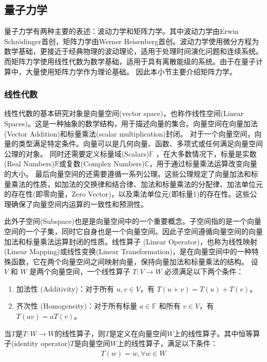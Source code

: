 \subsection{量子力学}
量子力学有两种主要的表述：波动力学和矩阵力学。其中波动力学由Erwin Schrödinger首创，矩阵力学由Werner Heisenberg首创。波动力学使用微分方程为数学基础，更接近于经典物理的波动理论，适用于处理时间演化问题和连续系统。
而矩阵力学使用线性代数为数学基础，适用于具有离散能级的系统。由于在量子计算中，大量使用矩阵力学作为理论基础。
因此本小节主要介绍矩阵力学。
\subsubsection*{线性代数}
线性代数的基本研究对象是向量空间(vector space)，也称作线性空间(Linear Spaces)。这是一种抽象的数学结构，用于描述向量的集合。向量空间在向量加法(Vector Addition)和标量乘法(scalar multiplication)封闭。
对于一个向量空间，向量的类型满足特定条件。向量可以是几何向量、函数、多项式或任何满足向量空间公理的对象。
同时还需要定义标量域(Scalars)\(\mathbb{F}\) ，在大多数情况下，标量是实数(Real Numbers)\(\mathbb{R}\)或复数(Complex Numbers)\(\mathbb{C}\)，用于通过标量乘法运算改变向量的大小。
最后向量空间的还需要遵循一系列公理。这些公理规定了向量加法和标量乘法的性质，如加法的交换律和结合律、加法和标量乘法的分配律、加法单位元的存在性(即零向量，Zero Vector)，以及乘法单位元(即标量1)的存在性。这些公理确保了向量空间内运算的一致性和预测性。

此外子空间(Subspace)也是是向量空间中的一个重要概念。子空间指的是一个向量空间的一个子集，同时它自身也是一个向量空间。因此子空间遵循向量空间的向量加法和标量乘法运算封闭的性质。线性算子 (Linear Operator)，也称为线性映射(Linear Mapping)或线性变换(Linear Transformation)，是在向量空间中的一种特殊函数，它在两个向量空间之间映射向量，保持向量加法和标量乘法的结构。%
设 \(V\) 和 \(W\) 是两个向量空间，一个线性算子 \(T: V \rightarrow W\) 必须满足以下两个条件：
\begin{enumerate}
    \item 加法性 (Additivity)：对于所有 \(u, v \in V\)，有 \(T(u + v) = T(u) + T(v)\)。
    \item 齐次性 (Homogeneity)：对于所有标量 \(a \in \mathbb{F}\) 和所有 \(v \in V\)，有 \(T(av) = aT(v)\)。
\end{enumerate}
当$T$是\(T: W \rightarrow W\)的线性算子，则$T$是定义在向量空间$W$上的线性算子。其中恒等算子(identity operator)$T$是向量空间$W$上的线性算子，满足以下条件：
\begin{align}
    T(w) = w,\forall w \in W
\end{align}

